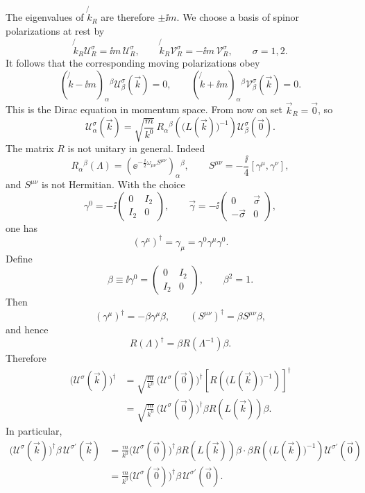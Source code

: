 The eigenvalues of \(\not{k}_R\) are therefore \(\pm \ii m\).  We choose a
basis of spinor polarizations at rest by
\[
  \not{k}_R\mathcal U_R^\sigma
  =
  \ii m\,\mathcal U_R^\sigma,
  \qquad
  \not{k}_R\mathcal V_R^\sigma
  =
  -\ii m\,\mathcal V_R^\sigma,
  \qquad
  \sigma=1,2.
\]
It follows that the corresponding moving polarizations obey
\[
  (\not{k}-\ii m)_\alpha{}^\beta
  \mathcal U_\beta^\sigma(\vec k)=0,
  \qquad
  (\not{k}+\ii m)_\alpha{}^\beta
  \mathcal V_\beta^\sigma(\vec k)=0.
\]
This is the Dirac equation in momentum space.  From now on set
\(\vec k_R=\vec0\), so
\[
  \mathcal U_\alpha^\sigma(\vec k)
  =
  \sqrt{\frac{m}{k^0}}\,
  R_\alpha{}^\beta\!\left(\bigl(L(\vec k)\bigr)^{-1}\right)
  \mathcal U_\beta^\sigma(\vec0).
\]
The matrix \(R\) is not unitary in general.  Indeed
\[
  R_\alpha{}^\beta(\Lambda)
  =
  \left(
    \ee^{-\frac{\ii}{2}\omega_{\mu\nu}S^{\mu\nu}}
  \right)_\alpha{}^\beta,
  \qquad
  S^{\mu\nu}=-\frac{\ii}{4}[\gamma^\mu,\gamma^\nu],
\]
and \(S^{\mu\nu}\) is not Hermitian.  With the choice
\[
  \gamma^0=-\ii
  \begin{pmatrix}
  0&I_2\\ I_2&0
  \end{pmatrix},
  \qquad
  \vec\gamma=-\ii
  \begin{pmatrix}
  0&\vec\sigma\\ -\vec\sigma&0
  \end{pmatrix},
\]
one has
\[
  (\gamma^\mu)^\dagger=\gamma_\mu=\gamma^0\gamma^\mu\gamma^0.
\]
Define
\[
  \beta\equiv \ii\gamma^0
  =
  \begin{pmatrix}
  0&I_2\\ I_2&0
  \end{pmatrix},
  \qquad
  \beta^2=1.
\]
Then
\[
  (\gamma^\mu)^\dagger=-\beta\gamma^\mu\beta,
  \qquad
  (S^{\mu\nu})^\dagger=\beta S^{\mu\nu}\beta,
\]
and hence
\[
  R(\Lambda)^\dagger=\beta R(\Lambda^{-1})\beta.
\]
Therefore
\[
\begin{aligned}
  \bigl(\mathcal U^\sigma(\vec k)\bigr)^\dagger
  &=
  \sqrt{\frac{m}{k^0}}\,
  \bigl(\mathcal U^\sigma(\vec0)\bigr)^\dagger
  \left[
    R\!\left(\bigl(L(\vec k)\bigr)^{-1}\right)
  \right]^\dagger
  \\
  &=
  \sqrt{\frac{m}{k^0}}\,
  \bigl(\mathcal U^\sigma(\vec0)\bigr)^\dagger
  \beta R(L(\vec k))\beta.
\end{aligned}
\]
In particular,
\[
\begin{aligned}
  \bigl(\mathcal U^\sigma(\vec k)\bigr)^\dagger
  \beta\,\mathcal U^{\sigma'}(\vec k)
  &=
  \frac{m}{k^0}
  \bigl(\mathcal U^\sigma(\vec0)\bigr)^\dagger
  \beta R(L(\vec k))\beta\cdot
  \beta
  R\!\left(\bigl(L(\vec k)\bigr)^{-1}\right)
  \mathcal U^{\sigma'}(\vec0)
  \\
  &=
  \frac{m}{k^0}
  \bigl(\mathcal U^\sigma(\vec0)\bigr)^\dagger
  \beta\,\mathcal U^{\sigma'}(\vec0).
\end{aligned}
\]

